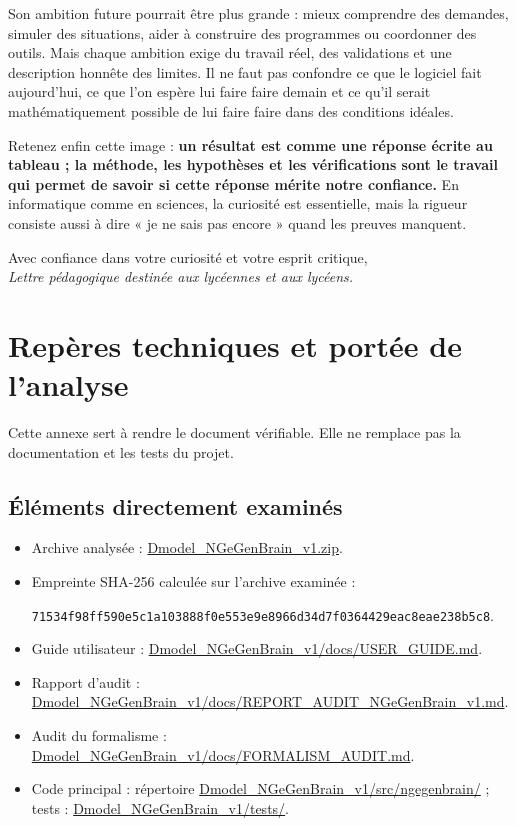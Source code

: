 \documentclass[11pt,a4paper]{article}
\begin{document}
Son ambition future pourrait être plus grande : mieux comprendre des demandes, simuler des situations, aider à construire des programmes ou coordonner des outils. Mais chaque ambition exige du travail réel, des validations et une description honnête des limites. Il ne faut pas confondre ce que le logiciel fait aujourd'hui, ce que l'on espère lui faire faire demain et ce qu'il serait mathématiquement possible de lui faire faire dans des conditions idéales.

Retenez enfin cette image : \textbf{un résultat est comme une réponse écrite au tableau ; la méthode, les hypothèses et les vérifications sont le travail qui permet de savoir si cette réponse mérite notre confiance.} En informatique comme en sciences, la curiosité est essentielle, mais la rigueur consiste aussi à dire « je ne sais pas encore » quand les preuves manquent.

\vspace{1em}
\noindent Avec confiance dans votre curiosité et votre esprit critique,\\[0.4em]
\noindent\textit{Lettre pédagogique destinée aux lycéennes et aux lycéens.}

\newpage
\appendix
\section*{Repères techniques et portée de l'analyse}

Cette annexe sert à rendre le document vérifiable. Elle ne remplace pas la documentation et les tests du projet.

\subsection*{Éléments directement examinés}

\begin{itemize}
  \item Archive analysée : \url{Dmodel_NGeGenBrain_v1.zip}.
  \item Empreinte SHA-256 calculée sur l'archive examinée :\par\smallskip\noindent\texttt{71534f98}\allowbreak\texttt{ff590e5c}\allowbreak\texttt{1a103888}\allowbreak\texttt{f0e553e9}\allowbreak\texttt{e8966d34}\allowbreak\texttt{d7f03644}\allowbreak\texttt{29eac8ea}\allowbreak\texttt{e238b5c8}.
  \item Guide utilisateur : \url{Dmodel_NGeGenBrain_v1/docs/USER_GUIDE.md}.
  \item Rapport d'audit : \url{Dmodel_NGeGenBrain_v1/docs/REPORT_AUDIT_NGeGenBrain_v1.md}.
  \item Audit du formalisme : \url{Dmodel_NGeGenBrain_v1/docs/FORMALISM_AUDIT.md}.
  \item Code principal : répertoire \url{Dmodel_NGeGenBrain_v1/src/ngegenbrain/} ; tests : \url{Dmodel_NGeGenBrain_v1/tests/}.
\end{itemize}
\end{document}
